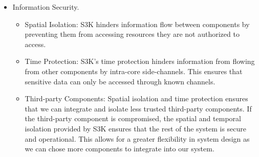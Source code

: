 \documentclass[a4paper,11pt]{article}
\begin{document}
\begin{itemize}
\begin{itemize}
			\end{itemize}
		\item Information Security.
			\begin{itemize}
				\item Spatial Isolation: 
					S3K hinders information flow between components by preventing them from accessing resources they are not authorized to access.
				\item Time Protection:
					S3K's time protection hinders information from flowing from other components by intra-core side-channels.
					This ensures that sensitive data can only be accessed through known channels.
				\item Third-party Components:
					Spatial isolation and time protection ensures that we can integrate and isolate less trusted third-party components.
					If the third-party component is compromised, the spatial and temporal isolation provided by S3K ensures that the rest of the system is secure and operational.
					This allows for a greater flexibility in system design as we can chose more components to integrate into our system.
			\end{itemize}
	\end{itemize}
\end{document}
